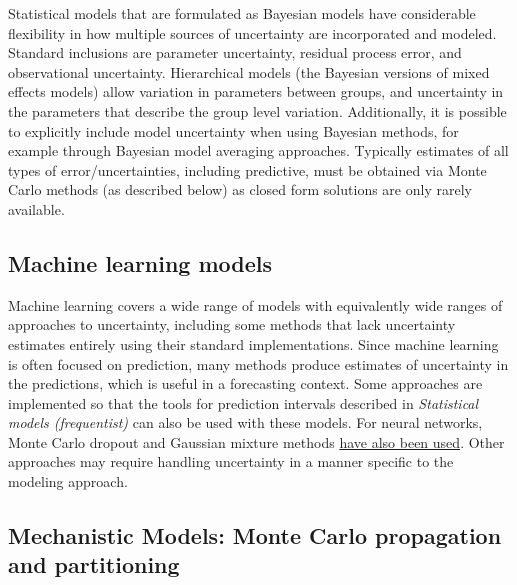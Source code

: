 \documentclass[
]{book}
\begin{document}
Statistical models that are formulated as Bayesian models have considerable flexibility in how multiple sources of uncertainty are incorporated and modeled. Standard inclusions are parameter uncertainty, residual process error, and observational uncertainty. Hierarchical models (the Bayesian versions of mixed effects models) allow variation in parameters between groups, and uncertainty in the parameters that describe the group level variation. Additionally, it is possible to explicitly include model uncertainty when using Bayesian methods, for example through Bayesian model averaging approaches. Typically estimates of all types of error/uncertainties, including predictive, must be obtained via Monte Carlo methods (as described below) as closed form solutions are only rarely available.

\hypertarget{machine-learning-models}{%
\subsection{Machine learning models}\label{machine-learning-models}}

Machine learning covers a wide range of models with equivalently wide ranges of approaches to uncertainty, including some methods that lack uncertainty estimates entirely using their standard implementations. Since machine learning is often focused on prediction, many methods produce estimates of uncertainty in the predictions, which is useful in a forecasting context. Some approaches are implemented so that the tools for prediction intervals described in \emph{Statistical models (frequentist)} can also be used with these models. For neural networks, Monte Carlo dropout and Gaussian mixture methods \href{https://arxiv.org/pdf/2012.14295.pdf}{have also been used}. Other approaches may require handling uncertainty in a manner specific to the modeling approach.

\hypertarget{mechanistic-models-monte-carlo-propagation-and-partitioning}{%
\subsection{Mechanistic Models: Monte Carlo propagation and partitioning}\label{mechanistic-models-monte-carlo-propagation-and-partitioning}}
\end{document}
